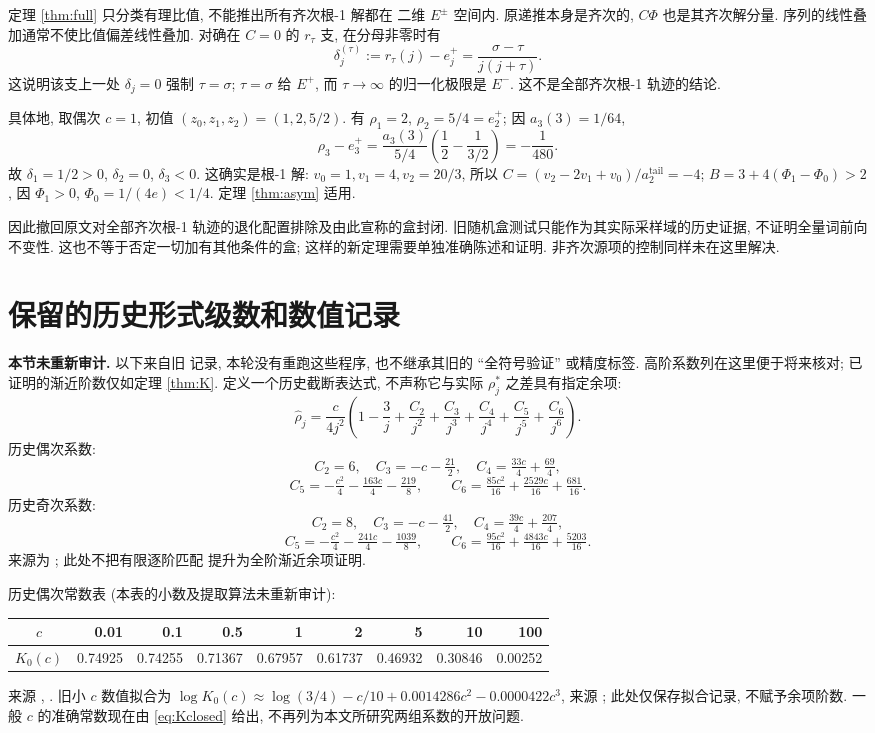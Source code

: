 \documentclass[UTF8]{ctexart}
\newcommand{\sig}{\sigma}
\begin{document}
定理 \ref{thm:full} 只分类有理比值, 不能推出所有齐次根-1 解都在
二维 $E^\pm$ 空间内. 原递推本身是齐次的, $C\Phi$ 也是其齐次解分量.
序列的线性叠加通常不使比值偏差线性叠加.
对确在 $C=0$ 的 $r_\tau$ 支, 在分母非零时有
\[
 \delta_j^{(\tau)}:=r_\tau(j)-e_j^+
 =\frac{\sig-\tau}{j(j+\tau)}.
\]
这说明该支上一处 $\delta_j=0$ 强制 $\tau=\sig$;
$\tau=\sig$ 给 $E^+$, 而 $\tau\to\infty$ 的归一化极限是 $E^-$.
这不是全部齐次根-1 轨迹的结论.

具体地, 取偶次 $c=1$, 初值 $(z_0,z_1,z_2)=(1,2,5/2)$.
有 $\rho_1=2$, $\rho_2=5/4=e_2^+$; 因 $a_3(3)=1/64$,
\[
 \rho_3-e_3^+=\frac{a_3(3)}{5/4}
       \left(\frac12-\frac{1}{3/2}\right)=-\frac1{480}.
\]
故 $\delta_1=1/2>0$, $\delta_2=0$, $\delta_3<0$.
这确实是根-1 解: $v_0=1,v_1=4,v_2=20/3$,
所以 $C=(v_2-2v_1+v_0)/a_2^{\mathrm{tail}}=-4$;
$B=3+4(\Phi_1-\Phi_0)>2$, 因 $\Phi_1>0$, $\Phi_0=1/(4e)<1/4$.
定理 \ref{thm:asym} 适用.

因此撤回原文对全部齐次根-1 轨迹的退化配置排除及由此宣称的盒封闭.
旧随机盒测试只能作为其实际采样域的历史证据, 不证明全量词前向不变性.
这也不等于否定一切加有其他条件的盒; 这样的新定理需要单独准确陈述和证明.
非齐次源项的控制同样未在这里解决.

\section{保留的历史形式级数和数值记录}\label{sec:history}

\noindent\textbf{本节未重新审计.}
以下来自旧  记录, 本轮没有重跑这些程序,
也不继承其旧的 ``全符号验证'' 或精度标签.
高阶系数列在这里便于将来核对; 已证明的渐近阶数仅如定理 \ref{thm:K}.
定义一个历史截断表达式, 不声称它与实际 $\rho_j^*$ 之差具有指定余项:
\begin{equation}\label{eq:rhos}
 \widehat\rho_j=\frac{c}{4j^2}\left(1-\frac3j+\frac{C_2}{j^2}
 +\frac{C_3}{j^3}+\frac{C_4}{j^4}+\frac{C_5}{j^5}+\frac{C_6}{j^6}\right).
\end{equation}
历史偶次系数:
\[
 C_2=6,\quad C_3=-c-\tfrac{21}2,\quad C_4=\tfrac{33c}4+\tfrac{69}4,
\]
\[
 C_5=-\tfrac{c^2}4-\tfrac{163c}4-\tfrac{219}8,\qquad
 C_6=\tfrac{85c^2}{16}+\tfrac{2529c}{16}+\tfrac{681}{16}.
\]
历史奇次系数:
\[
 C_2=8,\quad C_3=-c-\tfrac{41}2,\quad C_4=\tfrac{39c}4+\tfrac{207}4,
\]
\[
 C_5=-\tfrac{c^2}4-\tfrac{241c}4-\tfrac{1039}8,\qquad
 C_6=\tfrac{95c^2}{16}+\tfrac{4843c}{16}+\tfrac{5203}{16}.
\]
来源为 ; 此处不把有限逐阶匹配
提升为全阶渐近余项证明.

历史偶次常数表 (本表的小数及提取算法未重新审计):
\begin{center}\begin{tabular}{c|rrrrrrrr}
$c$ & 0.01 & 0.1 & 0.5 & 1 & 2 & 5 & 10 & 100\\\hline
$K_0(c)$ & 0.74925 & 0.74255 & 0.71367 & 0.67957 & 0.61737
 & 0.46932 & 0.30846 & 0.00252
\end{tabular}\end{center}
来源 , .
旧小 $c$ 数值拟合为
$\log K_0(c)\approx\log(3/4)-c/10+0.0014286c^2-0.0000422c^3$,
来源 ; 此处仅保存拟合记录, 不赋予余项阶数.
一般 $c$ 的准确常数现在由 \eqref{eq:Kclosed} 给出,
不再列为本文所研究两组系数的开放问题.
\end{document}
